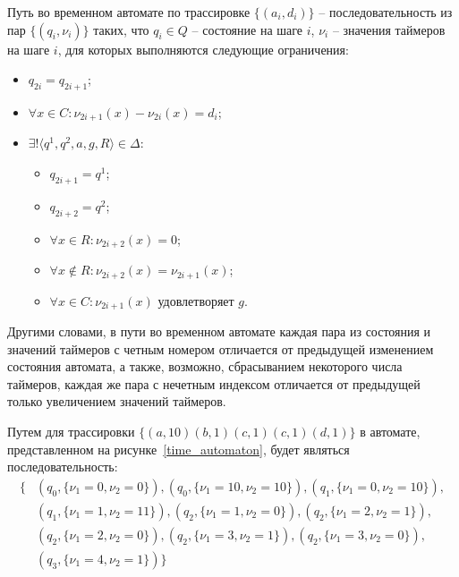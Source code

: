 \documentclass[times,specification,annotation]{itmo-student-thesis}
\begin{document}
\begin{definition}
  Путь во временном автомате по трассировке $\{\left( a_i, d_i \right)\}$ -- последовательность из пар $\{\left( q_i, \nu_i \right)\}$ таких, 
  что $q_i \in Q$ -- состояние на шаге $i$, $\nu_i$ -- значения таймеров на шаге $i$, для которых выполняются следующие ограничения:
  \begin{itemize}
    \item $q_{2i} = q_{2i+1}$;
    \item $\forall x \in C: \nu_{2i+1}(x) - \nu_{2i}(x) = d_i$;
    \item $\exists! \langle q^1, q^2, a, g, R \rangle \in \Delta$: 
      \begin{itemize}
	\item $q_{2i+1} = q^1$;
	\item $q_{2i+2} = q^2$;
        \item $\forall x \in R: \nu_{2i+2}(x) = 0$;
	\item $\forall x \not\in R: \nu_{2i+2}(x) = \nu_{2i+1}(x)$;
	\item $\forall x \in C: \nu_{2i+1}(x)$ удовлетворяет $g$.
      \end{itemize}
  \end{itemize}
\end{definition}

Другими словами, в пути во временном автомате каждая пара из состояния и значений таймеров с 
четным номером отличается от предыдущей изменением состояния автомата, а также, возможно, сбрасыванием некоторого числа таймеров, 
каждая же пара с нечетным индексом отличается от предыдущей только увеличением значений таймеров.

\begin{example}
  Путем для трассировки $\{ \left( a, 10 \right) \left( b, 1 \right) \left( c, 1 \right) \left( c, 1 \right) \left( d, 1 \right) \}$
  в автомате, представленном на рисунке~\ref{time_automaton}, будет являться последовательность:
  \begin{equation}
    \begin{split}
      \{ &\left( q_0, \{ \nu_1 = 0, \nu_2 = 0 \} \right), \left( q_0, \{ \nu_1 = 10, \nu_2 = 10 \} \right), \left( q_1, \{ \nu_1 = 0, \nu_2 = 10 \} \right), \\
	 &\left( q_1, \{ \nu_1 = 1, \nu_2 = 11 \} \right), \left( q_2, \{ \nu_1 = 1, \nu_2 = 0 \} \right), \left( q_2, \{ \nu_1 = 2, \nu_2 = 1 \} \right), \\
	 &\left( q_2, \{ \nu_1 = 2, \nu_2 = 0 \} \right), \left( q_2, \{ \nu_1 = 3, \nu_2 = 1 \}  \right), \left( q_2, \{ \nu_1 = 3, \nu_2 = 0 \} \right), \\
         &\left( q_3, \{ \nu_1 = 4, \nu_2 = 1 \} \right) \}
    \end{split}
  \end{equation}
\end{example}
\end{document}

